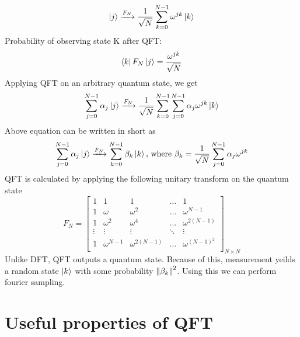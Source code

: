 \documentclass[11.5pt, paper=a4]{article}
\theoremstyle{definition}
\numberwithin{theorem}{section}
\begin{document}
\begin{equation}
\label{eqn:QFT on basis states}
    \ket j \xrightarrow{F_N}\frac{1}{\sqrt{N}}\sum_{k=0}^{N-1}\omega^{jk}\ket k
\end{equation}
Probability of observing state K after QFT:
\begin{equation*}
    \bra{k}F_N\ket{j} = \frac{\omega^{jk}}{\sqrt{N}}
\end{equation*}
Applying QFT on an arbitrary quantum state, we get
\begin{equation}
\label{eqn:QFT on an arbitrary state}
    \sum_{j=0}^{N-1}\alpha_j\ket{j} \xrightarrow{F_N} \frac{1}{\sqrt{N}}\sum_{k=0}^{N-1}\sum_{j=0}^{N-1}\alpha_j\omega^{jk}\ket{k}
\end{equation}
Above equation can be written in short as
\begin{equation*}
    \sum_{j=0}^{N-1}\alpha_j\ket{j} \xrightarrow{F_N} \sum_{k=0}^{N-1}\beta_k\ket{k} \text{, where } \beta_k = \frac{1}{\sqrt{N}}\sum_{j=0}^{N-1}\alpha_j\omega^{jk}
\end{equation*}
QFT is calculated by applying the following unitary transform on the quantum state
\begin{equation*}
    F_N = \begin{bmatrix} 
	1 & 1 & 1 & \dots & 1 \\
	1 & \omega & \omega^2 & \dots & \omega^{N-1}\\
	1 & \omega^2 & \omega^4 & \dots & \omega^{2(N-1)}\\
	\vdots & \vdots & \vdots & \ddots  & \vdots\\
	1 & \omega^{N-1} & \omega^{2(N-1)} & \dots & \omega^{(N-1)^2}\\
	\end{bmatrix}_{N\times N}
\end{equation*}
Unlike DFT, QFT outputs a quantum state. Because of this, measurement yeilds a random state $\ket{k}$ with some probability $\norm{\beta_k}^2$. Using this we can perform fourier sampling.
\section{Useful properties of QFT}
\end{document}
